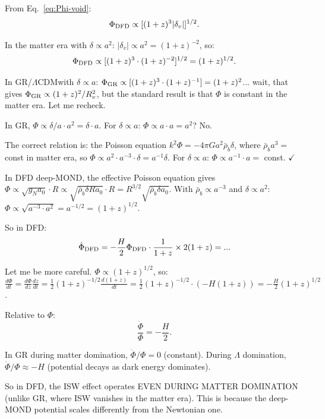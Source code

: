 \documentclass[11pt]{article}
\newcommand{\LCDM}{$\Lambda$CDM}
\newcommand{\aM}{a_0}
\newcommand{\rhob}{\bar{\rho}_b}
\begin{document}
From Eq.~\eqref{eq:Phi-void}:
\begin{equation}
\Phi_{\rm DFD} \propto [(1+z)^3|\delta_v|]^{1/2}.
\end{equation}

In the matter era with $\delta \propto a^2$: $|\delta_v| \propto a^2
= (1+z)^{-2}$, so:
\begin{equation}
\Phi_{\rm DFD} \propto [(1+z)^3\cdot(1+z)^{-2}]^{1/2}
= (1+z)^{1/2}.
\end{equation}

In GR/\LCDM with $\delta \propto a$:
$\Phi_{\rm GR} \propto [(1+z)^3\cdot(1+z)^{-1}] = (1+z)^2$...
wait, that gives $\Phi_{\rm GR} \propto (1+z)^2/R_v^2$, but the
standard result is that $\Phi$ is constant in the matter era.
Let me recheck.

In GR, $\Phi \propto \delta/a\cdot a^2 = \delta\cdot a$. For
$\delta \propto a$: $\Phi \propto a\cdot a = a^2$? No.

The correct relation is: the Poisson equation $k^2\Phi = -4\pi G
a^2\rhob\delta$, where $\rhob a^3 = $ const in matter era, so
$\Phi \propto a^2\cdot a^{-3}\cdot\delta = a^{-1}\delta$. For
$\delta \propto a$: $\Phi \propto a^{-1}\cdot a = $ const. $\checkmark$

In DFD deep-MOND, the effective Poisson equation gives
$\Phi \propto \sqrt{g_N\aM}\cdot R \propto \sqrt{\rhob\delta R\aM}
\cdot R = R^{3/2}\sqrt{\rhob\delta\aM}$.
With $\rhob \propto a^{-3}$ and $\delta \propto a^2$:
$\Phi \propto \sqrt{a^{-3}\cdot a^2} = a^{-1/2} = (1+z)^{1/2}$.

So in DFD:
\begin{equation}
\dot\Phi_{\rm DFD} = -\frac{H}{2}\Phi_{\rm DFD}\cdot\frac{1}{1+z}
\times 2(1+z) = ...
\end{equation}

Let me be more careful. $\Phi \propto (1+z)^{1/2}$, so:
$\frac{d\Phi}{dt} = \frac{d\Phi}{dz}\frac{dz}{dt}
= \frac{1}{2}(1+z)^{-1/2}\frac{d(1+z)}{dt}
= \frac{1}{2}(1+z)^{-1/2}\cdot(-H(1+z))
= -\frac{H}{2}(1+z)^{1/2}$.

Relative to $\Phi$:
\begin{equation}
\frac{\dot\Phi}{\Phi} = -\frac{H}{2}.
\end{equation}

In GR during matter domination, $\dot\Phi/\Phi = 0$ (constant).
During $\Lambda$ domination, $\dot\Phi/\Phi \approx -H$
(potential decays as dark energy dominates).

So in DFD, the ISW effect operates EVEN DURING MATTER DOMINATION
(unlike GR, where ISW vanishes in the matter era). This is because
the deep-MOND potential scales differently from the Newtonian one.
\end{document}
